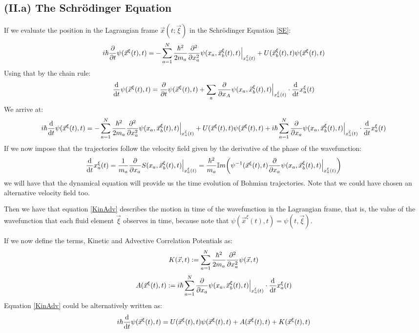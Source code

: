 \documentclass[11pt, a4paper]{article} %
\begin{document}
\subsection*{(II.a) The Schrödinger Equation}
If we evaluate the position in the Lagrangian frame $\vec{x}(t;\vec{\xi})$ in the Schrödinger Equation \eqref{SE}:
\begin{equation}
i\hbar \pdv{}{t}\psi(\vec{x}^\xi(t),t)=-\sum_{a=1}^N \frac{\hbar^2}{2m_a}\pdv[2]{}{x_a}\psi(x_a, \vec{x}_b^\xi(t),t)\Big\rvert_{x^\xi_a(t)}+U(\vec{x}_b^\xi(t),t)\psi(\vec{x}^\xi(t),t)
\end{equation}
Using that by the chain rule:
\begin{equation}
\dv{}{t}\psi(\vec{x}^\xi(t), t)=\pdv{}{t}\psi(\vec{x}^\xi(t), t)+\sum_a \pdv{}{x_A}\psi(x_a,\vec{x}_b^\xi(t), t)\Big\rvert_{x^\xi_a(t)}\cdot \dv{}{t}x^\xi_a(t)
\end{equation}
We arrive at:
\begin{equation}\label{KinAdv}
i\hbar \dv{}{t}\psi(\vec{x}^\xi(t),t)=-\sum_{a=1}^N \frac{\hbar^2}{2m_a}\pdv[2]{}{x_a}\psi(x_a, \vec{x}_b^\xi(t),t)\Big\rvert_{x^\xi_a(t)}+U(\vec{x}^\xi(t),t)\psi(\vec{x}^\xi(t),t)+i\hbar \sum_{a=1}^N  \pdv{}{x_a}\psi(x_a,\vec{x}_b^\xi(t), t)\Big\rvert_{x^\xi_a(t)}\cdot \dv{}{t}x^\xi_a(t)
\end{equation}
If we now impose that the trajectories follow the velocity field given by the derivative of the phase of the wavefunction:
\begin{equation}\label{ImpBohm}
\dv{}{t}x_a^\xi(t)=\frac{1}{m_a}\pdv{}{x_a}S(x_a, \vec{x}_b^\xi(t),t)\Big\rvert_{x^\xi_a(t)}=\frac{\hbar^2}{m_a}\mathbb{I}m \qty( \psi^{-1}(\vec{x}^\xi(t),t)\pdv{}{x_a}\psi(x_a, \vec{x}_b^\xi(t),t)\Big\rvert_{x^\xi_a(t)})
\end{equation}
 we will have that the dynamical equation will provide us the time evolution of Bohmian trajectories. Note that we could have chosen an alternative velocity field too.
 
Then we have that equation \eqref{KinAdv} describes the motion in time of the wavefunction in the Lagrangian frame, that is, the value of the wavefunction that each fluid element $\vec{\xi}$ observes in time, because note that $\psi(\vec{x}^\xi(t),t)=\psi(t, \vec{\xi})$.

If we now define the terms, Kinetic and Advective Correlation Potentials as:
\begin{equation}\label{Kin}
K(\vec{x},t):=\sum_{a=1}^N \frac{\hbar^2}{2m_a}\pdv[2]{}{x_a}\psi(\vec{x},t)
\end{equation}
\begin{equation}\label{Adv}
A(\vec{x}^\xi(t),t):=i\hbar \sum_{a=1}^N \pdv{}{x_a}\psi(x_a,\vec{x}_b^\xi(t), t)\Big\rvert_{x^\xi_a(t)}\cdot \dv{}{t}x^\xi_a(t)
\end{equation}
Equation \eqref{KinAdv} could be alternatively written as:
\begin{equation}
i\hbar \dv{}{t}\psi(\vec{x}^\xi(t),t)=U(\vec{x}^\xi(t),t)\psi(\vec{x}^\xi(t),t)+A(\vec{x}^\xi(t),t)+K(\vec{x}^\xi(t),t)
\end{equation}
\end{document}
